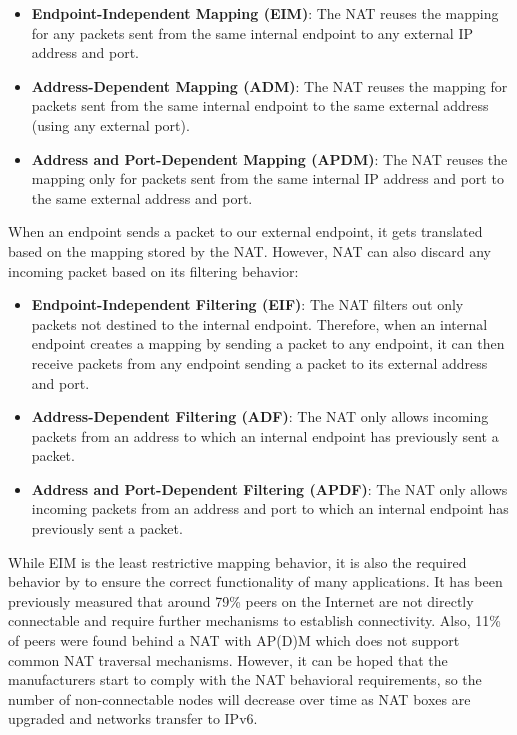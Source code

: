 \begin{itemize}
    \item \textbf{Endpoint-Independent Mapping (EIM)}: The NAT reuses the mapping for any packets sent from the same internal endpoint to any external IP address and port.
    \item \textbf{Address-Dependent Mapping (ADM)}: The NAT reuses the mapping for packets sent from the same internal endpoint to the same external address (using any external port).
    \item \textbf{Address and Port-Dependent Mapping (APDM)}: The NAT reuses the mapping only for packets sent from the same internal IP address and port to the same external address and port.
\end{itemize}


When an endpoint sends a packet to our external endpoint, it gets translated based on the mapping stored by the NAT. However, NAT can also discard any incoming packet based on its filtering behavior:

\begin{itemize}
    \item \textbf{Endpoint-Independent Filtering (EIF)}: The NAT filters out only packets not destined to the internal endpoint. Therefore, when an internal endpoint creates a mapping by sending a packet to any endpoint, it can then receive packets from any endpoint sending a packet to its external address and port.
    \item \textbf{Address-Dependent Filtering (ADF)}: The NAT only allows incoming packets from an address to which an internal endpoint has previously sent a packet.
    \item \textbf{Address and Port-Dependent Filtering (APDF)}: The NAT only allows incoming packets from an address and port to which an internal endpoint has previously sent a packet.
\end{itemize}

While EIM is the least restrictive mapping behavior, it is also the required behavior by \cite{behave} to ensure the correct functionality of many applications. It has been previously measured that around 79\% peers on the Internet are not directly connectable and require further mechanisms to establish connectivity. Also, 11\% of peers were found behind a NAT with AP(D)M which does not support common NAT traversal mechanisms. \cite{nat_wild} However, it can be hoped that the manufacturers start to comply with the NAT behavioral requirements, so the number of non-connectable nodes will decrease over time as NAT boxes are upgraded and networks transfer to IPv6.

